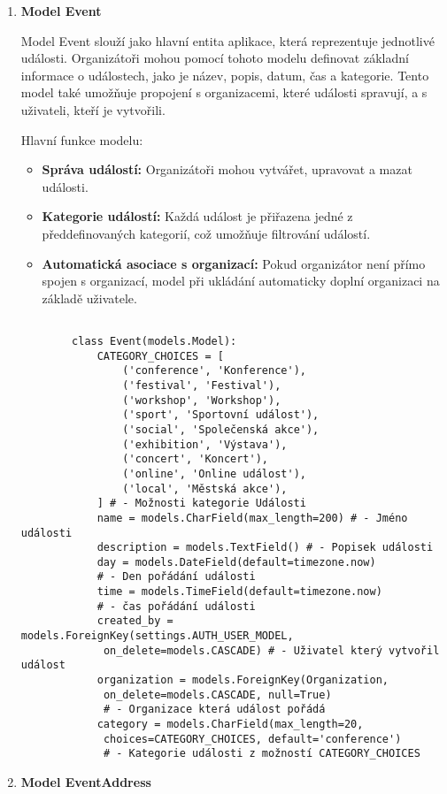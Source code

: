 \documentclass[12pt, a4paper,
twoside,        %
openright
]{report}
\begin{document}
\begin{enumerate}
	\item \textbf{Model Event}
	
	Model Event slouží jako hlavní entita aplikace, která reprezentuje jednotlivé události. Organizátoři mohou pomocí tohoto modelu definovat základní informace o událostech, jako je název, popis, datum, čas a kategorie. Tento model také umožňuje propojení s organizacemi, které události spravují, a s uživateli, kteří je vytvořili.
	
	Hlavní funkce modelu:
	
	\begin{itemize}
		\item \textbf{Správa událostí:} Organizátoři mohou vytvářet, upravovat a mazat události.
		\item \textbf{Kategorie událostí:} Každá událost je přiřazena jedné z předdefinovaných kategorií, což umožňuje filtrování událostí.
		\item \textbf{Automatická asociace s organizací:} Pokud organizátor není přímo spojen s organizací, model při ukládání automaticky doplní organizaci na základě uživatele.
	\end{itemize}
	
	
	\begin{lstlisting}[style=Python, caption={Model Události}]
		
		class Event(models.Model):
			CATEGORY_CHOICES = [
				('conference', 'Konference'),
				('festival', 'Festival'),
				('workshop', 'Workshop'),
				('sport', 'Sportovní událost'),
				('social', 'Společenská akce'),
				('exhibition', 'Výstava'),
				('concert', 'Koncert'),
				('online', 'Online událost'),
				('local', 'Městská akce'),
			] # - Možnosti kategorie Události
			name = models.CharField(max_length=200) # - Jméno události
			description = models.TextField() # - Popisek události
			day = models.DateField(default=timezone.now) 
			# - Den pořádání události
			time = models.TimeField(default=timezone.now) 
			# - čas pořádání události
			created_by = models.ForeignKey(settings.AUTH_USER_MODEL,
			 on_delete=models.CASCADE) # - Uživatel který vytvořil událost
			organization = models.ForeignKey(Organization,
			 on_delete=models.CASCADE, null=True) 
			 # - Organizace která událost pořádá
			category = models.CharField(max_length=20,
			 choices=CATEGORY_CHOICES, default='conference') 
			 # - Kategorie události z možností CATEGORY_CHOICES
	\end{lstlisting}
	
	\item \textbf{Model EventAddress}
	

\end{enumerate}
\end{document}
